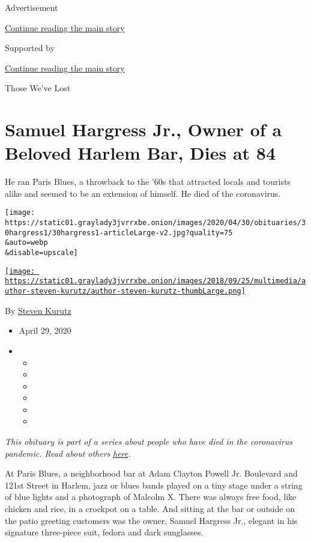 Advertisement

\protect\hyperlink{after-top}{Continue reading the main story}

Supported by

\protect\hyperlink{after-sponsor}{Continue reading the main story}

Those We've Lost

\hypertarget{samuel-hargress-jr-owner-of-a-beloved-harlem-bar-dies-at-84}{%
\section{Samuel Hargress Jr., Owner of a Beloved Harlem Bar, Dies at
84}\label{samuel-hargress-jr-owner-of-a-beloved-harlem-bar-dies-at-84}}

He ran Paris Blues, a throwback to the '60s that attracted locals and
tourists alike and seemed to be an extension of himself. He died of the
coronavirus.

\texttt{[image: https://static01.graylady3jvrrxbe.onion/images/2020/04/30/obituaries/30hargress1/30hargress1-articleLarge-v2.jpg?quality=75\\\&auto=webp\\\&disable=upscale]}

\href{https://www.nytimes3xbfgragh.onion/by/steven-kurutz}{\texttt{[image: https://static01.graylady3jvrrxbe.onion/images/2018/09/25/multimedia/author-steven-kurutz/author-steven-kurutz-thumbLarge.png]}}

By \href{https://www.nytimes3xbfgragh.onion/by/steven-kurutz}{Steven
Kurutz}

\begin{itemize}
\item
  April 29, 2020
\item
  \begin{itemize}
  \item
  \item
  \item
  \item
  \item
  \item
  \end{itemize}
\end{itemize}

\emph{This obituary is part of a series about people who have died in
the coronavirus pandemic. Read about others}
\href{https://www.nytimes3xbfgragh.onion/series/people-who-have-died-of-the-coronavirus}{\emph{here}}\emph{.}

At Paris Blues, a neighborhood bar at Adam Clayton Powell Jr. Boulevard
and 121st Street in Harlem, jazz or blues bands played on a tiny stage
under a string of blue lights and a photograph of Malcolm X. There was
always free food, like chicken and rice, in a crockpot on a table. And
sitting at the bar or outside on the patio greeting customers was the
owner, Samuel Hargress Jr., elegant in his signature three-piece suit,
fedora and dark sunglasses.

